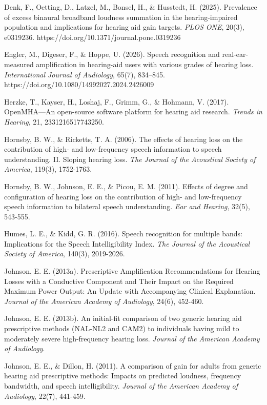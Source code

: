 \documentclass[
  12pt,
]{article}
\begin{document}
Denk, F., Oetting, D., Latzel, M., Bonsel, H., \& Husstedt, H. (2025).
Prevalence of excess binaural broadband loudness summation in the
hearing-impaired population and implications for hearing aid gain
targets. \emph{PLOS ONE}, 20(3), e0319236.
https://doi.org/10.1371/journal.pone.0319236

Engler, M., Digeser, F., \& Hoppe, U. (2026). Speech recognition and
real-ear-measured amplification in hearing-aid users with various grades
of hearing loss. \emph{International Journal of Audiology}, 65(7),
834--845. https://doi.org/10.1080/14992027.2024.2426009

Herzke, T., Kayser, H., Loshaj, F., Grimm, G., \& Hohmann, V. (2017).
OpenMHA---An open-source software platform for hearing aid research.
\emph{Trends in Hearing}, 21, 2331216517743250.

Hornsby, B. W., \& Ricketts, T. A. (2006). The effects of hearing loss
on the contribution of high- and low-frequency speech information to
speech understanding. II. Sloping hearing loss. \emph{The Journal of the
Acoustical Society of America}, 119(3), 1752-1763.

Hornsby, B. W., Johnson, E. E., \& Picou, E. M. (2011). Effects of
degree and configuration of hearing loss on the contribution of high-
and low-frequency speech information to bilateral speech understanding.
\emph{Ear and Hearing}, 32(5), 543-555.

Humes, L. E., \& Kidd, G. R. (2016). Speech recognition for multiple
bands: Implications for the Speech Intelligibility Index. \emph{The
Journal of the Acoustical Society of America}, 140(3), 2019-2026.

Johnson, E. E. (2013a). Prescriptive Amplification Recommendations for
Hearing Losses with a Conductive Component and Their Impact on the
Required Maximum Power Output: An Update with Accompanying Clinical
Explanation. \emph{Journal of the American Academy of Audiology}, 24(6),
452-460.

Johnson, E. E. (2013b). An initial-fit comparison of two generic hearing
aid prescriptive methods (NAL-NL2 and CAM2) to individuals having mild
to moderately severe high-frequency hearing loss. \emph{Journal of the
American Academy of Audiology}.

Johnson, E. E., \& Dillon, H. (2011). A comparison of gain for adults
from generic hearing aid prescriptive methods: Impacts on predicted
loudness, frequency bandwidth, and speech intelligibility. \emph{Journal
of the American Academy of Audiology}, 22(7), 441-459.
\end{document}
